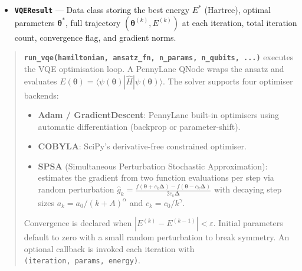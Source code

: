 \documentclass[
  11pt,
]{report}
\providecommand{\tightlist}{%
  \setlength{\itemsep}{0pt}\setlength{\parskip}{0pt}}
\begin{document}
\begin{itemize}
\tightlist
\item
  \textbf{\texttt{VQEResult}} --- Data class storing the best energy
  \(E^*\) (Hartree), optimal parameters \(\boldsymbol{\theta}^*\), full
  trajectory \((\boldsymbol{\theta}^{(k)}, E^{(k)})\) at each iteration,
  total iteration count, convergence flag, and gradient norms.
\end{itemize}

\begin{quote}
\textbf{\texttt{run\_vqe(hamiltonian,\ ansatz\_fn,\ n\_params,\ n\_qubits,\ ...)}}
executes the VQE optimisation loop. A PennyLane QNode wraps the ansatz
and evaluates
\(E(\boldsymbol{\theta}) = \langle\psi(\boldsymbol{\theta})|\hat{H}|\psi(\boldsymbol{\theta})\rangle\).
The solver supports four optimiser backends:

\begin{itemize}
\tightlist
\item
  \textbf{Adam / GradientDescent}: PennyLane built-in optimisers using
  automatic differentiation (backprop or parameter-shift).
\item
  \textbf{COBYLA}: SciPy's derivative-free constrained optimiser.
\item
  \textbf{SPSA} (Simultaneous Perturbation Stochastic Approximation):
  estimates the gradient from two function evaluations per step via
  random perturbation
  \(\hat{g}_k = \frac{f(\boldsymbol{\theta}+c_k\boldsymbol{\Delta}) - f(\boldsymbol{\theta}-c_k\boldsymbol{\Delta})}{2c_k\boldsymbol{\Delta}}\)
  with decaying step sizes \(a_k = a_0/(k+A)^\alpha\) and
  \(c_k = c_0/k^\gamma\).
\end{itemize}

Convergence is declared when \(|E^{(k)} - E^{(k-1)}| < \varepsilon\).
Initial parameters default to zero with a small random perturbation to
break symmetry. An optional callback is invoked each iteration with
\texttt{(iteration,\ params,\ energy)}.
\end{quote}
\end{document}
